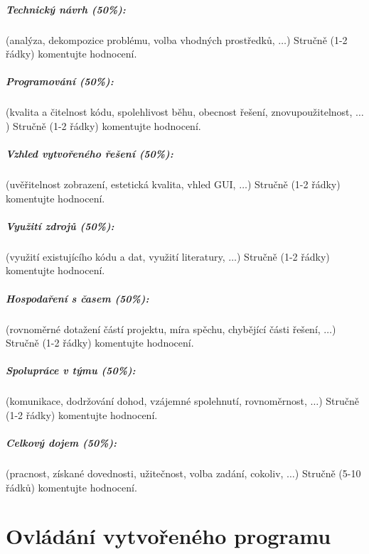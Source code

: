 \documentclass[12pt,a4paper,titlepage,final]{report}
\begin{document}
\paragraph{Technický návrh (50\%):} (analýza, dekompozice problému, volba
vhodných prostředků, $\ldots$) 
Stručně (1-2 řádky) komentujte hodnocení. 

\paragraph{Programování (50\%):} (kvalita a čitelnost kódu, spolehlivost běhu,
obecnost řešení, znovupoužitelnost, $\ldots$)
Stručně (1-2 řádky) komentujte hodnocení. 

\paragraph{Vzhled vytvořeného řešení (50\%):} (uvěřitelnost zobrazení,
estetická kvalita, vhled GUI, $\ldots$)
Stručně (1-2 řádky) komentujte hodnocení. 

\paragraph{Využití zdrojů (50\%):} (využití existujícího kódu a dat, využití
literatury, $\ldots$)
Stručně (1-2 řádky) komentujte hodnocení. 

\paragraph{Hospodaření s časem (50\%):} (rovnoměrné dotažení částí projektu,
míra spěchu, chybějící části řešení, $\ldots$)
Stručně (1-2 řádky) komentujte hodnocení. 

\paragraph{Spolupráce v týmu (50\%):} (komunikace, dodržování dohod, vzájemné
spolehnutí, rovnoměrnost, $\ldots$)
Stručně (1-2 řádky) komentujte hodnocení. 

\paragraph{Celkový dojem (50\%):} (pracnost, získané dovednosti, užitečnost,
volba zadání, cokoliv, $\ldots$)
Stručně (5-10 řádků) komentujte hodnocení. 

\chapter{Ovládání vytvořeného programu}
\end{document}
